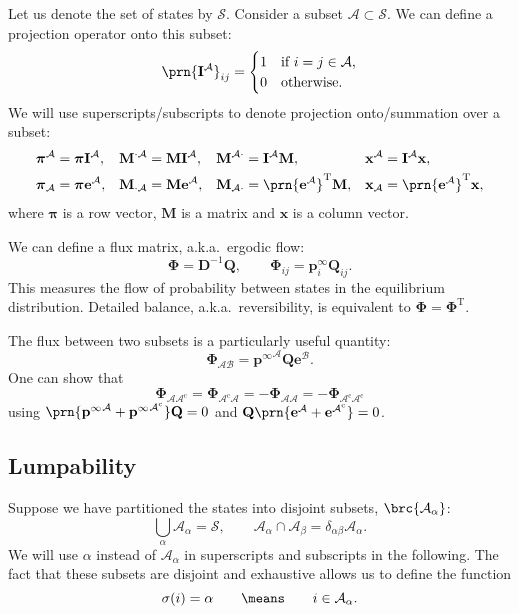 \documentclass{article} %
\newcommand{\inv}{^{-1}}
\newcommand{\trans}{^\mathrm{T}}
\newcommand{\I}{\mathbf{I}}
\newcommand{\onev}{\mathbf{e}}
\newcommand{\MM}{\mathbf{Q}}
\newcommand{\pr}{\mathbf{p}}
\newcommand{\eq}{\pr^\infty}
\newcommand{\D}{\mathbf{D}}
\newcommand{\pib}{\boldsymbol{\pi}}
\newcommand{\M}{\mathbf{M}}
\newcommand{\F}{\boldsymbol{\Phi}}
\newcommand{\CS}{\mathcal{S}}
\newcommand{\CA}{\mathcal{A}}
\newcommand{\CB}{\mathcal{B}}
\newcommand{\comp}{^\mathrm{c}}
\begin{document}
Let us denote the set of states by $\CS$.
Consider a subset $\CA\subset\CS$.
We can define a projection operator onto this subset:
%
\begin{equation}\label{eq:proj}
  \prn{\I^\CA}_{ij} =
    \begin{cases}
      1 &\text{if $i=j\in\CA$,}\\
      0 &\text{otherwise.}
    \end{cases}
\end{equation}
%
We will use superscripts/subscripts to denote projection onto/summation over a subset:
%
\begin{equation}\label{eq:projsum}
  \begin{aligned}
    \pib^\CA &=\pib\I^\CA, &
    \M^{\cdot\CA}&=\M\I^\CA, &
    \M^{\CA\cdot}&=\I^\CA\M, &
    \mathbf{x}^\CA &= \I^\CA\mathbf{x},
    \\
    \pib_\CA &=\pib\onev^\CA, &
    \M_{\cdot\CA}&=\M\onev^\CA, &
    \M_{\CA\cdot}&=\prn{\onev^\CA}\trans\M, &
    \mathbf{x}_\CA &= \prn{\onev^\CA}\trans\mathbf{x},
  \end{aligned}
\end{equation}
%
where $\pib$ is a row vector, $\M$ is a matrix and $\mathbf{x}$ is a column vector.

We can define a flux matrix, a.k.a.\ ergodic flow:
%
\begin{equation}\label{eq:flux}
  \F = \D\inv\MM,
  \qquad
  \F_{ij} = \eq_i \MM_{ij}.
\end{equation}
%
This measures the flow of probability between states in the equilibrium distribution.
Detailed balance, a.k.a.\ reversibility, is equivalent to $\F=\F\trans$.

The flux between two subsets is a particularly useful quantity:
%
\begin{equation}\label{eq:subflux}
  \F_{\CA\CB} = {\eq}^\CA\MM\onev^\CB.
\end{equation}
%
One can show that
%
\begin{equation}\label{eq:compflux}
  \F_{\CA\CA\comp} = \F_{\CA\comp\CA} = -\F_{\CA\CA} = -\F_{\CA\comp\CA\comp}
\end{equation}
%
using $\prn{{\eq}^\CA + {\eq}^{\CA\comp}}\MM=0$ and $\MM\prn{{\onev}^\CA + {\onev}^{\CA\comp}}=0$.

\subsection{Lumpability}\label{sec:lump}

Suppose we have partitioned the states into disjoint subsets, $\brc{\CA_\alpha}$:
%
\begin{equation}\label{eq:partition}
  \bigcup_\alpha \CA_\alpha = \CS,
  \qquad
  \CA_\alpha \cap \CA_\beta = \delta_{\alpha\beta}\CA_\alpha.
\end{equation}
%
We will use $\alpha$ instead of $\CA_\alpha$ in superscripts and subscripts in the following.
The fact that these subsets are disjoint and exhaustive allows us to define the function
%
\begin{equation}\label{eq:whichsey}
  \sigma(i)=\alpha
  \qquad\means\qquad
  i\in\CA_\alpha.
\end{equation}
%
\end{document}

